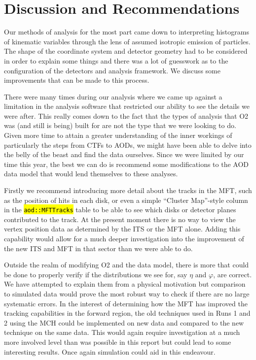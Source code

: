 \documentclass[11pt]{article}
\numberwithin{equation}{section}
\numberwithin{figure}{section}
\numberwithin{table}{section}
\let\OldTexttt\texttt
\renewcommand{\texttt}[1]{\OldTexttt{\hl{#1}}}
\begin{document}
\section{Discussion and Recommendations}
Our methods of analysis for the most part came down to interpreting histograms of kinematic variables through the lens of assumed isotropic emission of particles. The shape of the coordinate system and detector geometry had to be considered in order to explain some things and there was a lot of guesswork as to the configuration of the detectors and analysis framework. We discuss some improvements that can be made to this process.

There were many times during our analysis where we came up against a limitation in the analysis software that restricted our ability to see the details we were after. This really comes down to the fact that the types of analysis that O2 was (and still is being) built for are not the type that we were looking to do. Given more time to attain a greater understanding of the inner workings of particularly the steps from CTFs to AODs, we might have been able to delve into the belly of the beast and find the data ourselves. Since we were limited by our time this year, the best we can do is recommend some modifications to the AOD data model that would lend themselves to these analyses. 

Firstly we recommend introducing more detail about the tracks in the MFT, such as the position of hits in each disk, or even a simple ``Cluster Map''-style column in the \texttt{aod::MFTTracks} table to be able to see which disks or detector planes contributed to the track. At the present moment there is no way to view the vertex position data as determined by the ITS or the MFT alone. Adding this capability would allow for a much deeper investigation into the improvement of the new ITS and MFT in that sector than we were able to do.

Outside the realm of modifying O2 and the data model, there is more that could be done to properly verify if the distributions we see for, say $\eta$ and $\varphi$, are correct. We have attempted to explain them from a physical motivation but comparison to simulated data would prove the most robust way to check if there are no large systematic errors. In the interest of determining how the MFT has improved the tracking capabilities in the forward region, the old techniques used in Runs 1 and 2 using the MCH could be implemented on new data and compared to the new technique on the same data. This would again require investigation at a much more involved level than was possible in this report but could lead to some interesting results. Once again simulation could aid in this endeavour. 
\end{document}
